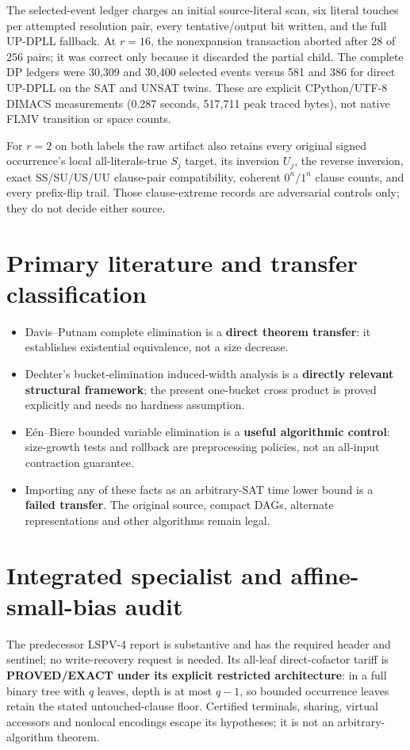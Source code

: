 \documentclass[11pt]{article}
\begin{document}
The selected-event ledger charges an initial source-literal scan, six literal
touches per attempted resolution pair, every tentative/output bit written, and
the full UP-DPLL fallback.  At $r=16$, the nonexpansion transaction aborted
after 28 of 256 pairs; it was correct only because it discarded the partial
child.  The complete DP ledgers were 30,309 and 30,400 selected events versus
581 and 386 for direct UP-DPLL on the SAT and UNSAT twins.  These are explicit
CPython/UTF-8 DIMACS measurements (0.287 seconds, 517,711 peak traced bytes),
not native FLMV transition or space counts.

For $r=2$ on both labels the raw artifact also retains every original signed
occurrence's local all-literals-true $S_j$ target, its inversion $U_j$, the
reverse inversion, exact SS/SU/US/UU clause-pair compatibility, coherent
$0^n/1^n$ clause counts, and every prefix-flip trail.  Those clause-extreme
records are adversarial controls only; they do not decide either source.

\section{Primary literature and transfer classification}
\begin{itemize}
\item Davis--Putnam complete elimination is a \textbf{direct theorem transfer}:
it establishes existential equivalence, not a size decrease.
\item Dechter's bucket-elimination induced-width analysis is a
\textbf{directly relevant structural framework}; the present one-bucket
cross product is proved explicitly and needs no hardness assumption.
\item E\'en--Biere bounded variable elimination is a \textbf{useful algorithmic
control}: size-growth tests and rollback are preprocessing policies, not an
all-input contraction guarantee.
\item Importing any of these facts as an arbitrary-SAT time lower bound is a
\textbf{failed transfer}.  The original source, compact DAGs, alternate
representations and other algorithms remain legal.
\end{itemize}

\section{Integrated specialist and affine-small-bias audit}
The predecessor LSPV-4 report is substantive and has the required header and
sentinel; no write-recovery request is needed.  Its all-leaf direct-cofactor
tariff is \textbf{PROVED/EXACT under its explicit restricted architecture}:
in a full binary tree with $q$ leaves, depth is at most $q-1$, so bounded
occurrence leaves retain the stated untouched-clause floor.  Certified
terminals, sharing, virtual accessors and nonlocal encodings escape its
hypotheses; it is not an arbitrary-algorithm theorem.
\end{document}
